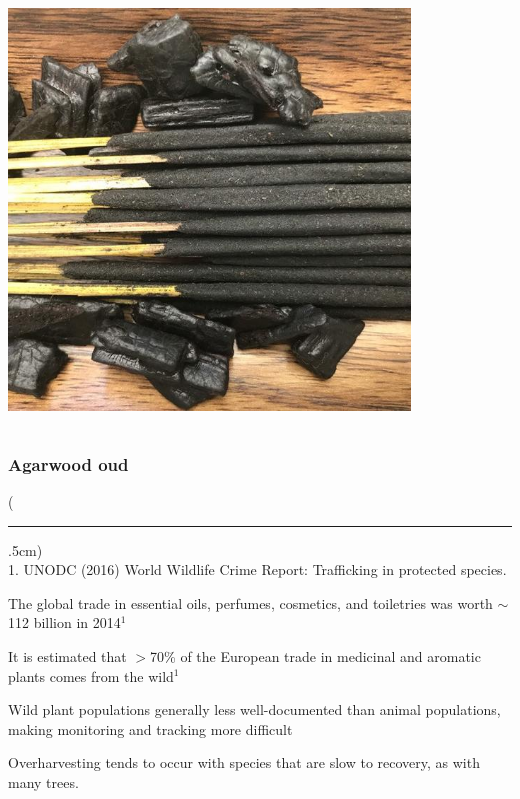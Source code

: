 \documentclass[10pt]{beamer}
\newenvironment{reference}[2]{%
	\begin{textblock*}{\textwidth}(#1,#2)
		\tiny\bgroup\color{gray}}{\egroup\end{textblock*}}
\begin{document}
\begin{frame}
\begin{center}
\begin{columns}
			\begin{column}{0.5\textwidth}
				\begin{center}
					\includegraphics[width=0.8\textwidth]{figures/agarwood2.jpg}
				\end{center}
			\end{column}
		\end{columns}
	\end{center}
\end{frame}


\begin{frame}[t]
\frametitle{Agarwood oud}
\vspace{0.5cm}

	\begin{reference}{4mm}{92mm}
		\rule{1.5cm}{0.25pt}\\
		1. UNODC (2016) World Wildlife Crime Report: Trafficking in protected species.
	\end{reference}
	
	The global trade in essential oils, perfumes, cosmetics, and toiletries was worth $\sim$112 billion in 2014$^{1}$\\
	
	\vspace{0.5cm}
	
	It is estimated that $>$70\% of the European trade in medicinal and aromatic plants comes from the wild$^{1}$\\
	
	\vspace{0.5cm}
	
	Wild plant populations generally less well-documented than animal populations, making monitoring and tracking more difficult\\
	
	\vspace{0.5cm}
	
	Overharvesting tends to occur with species that are slow to recovery, as with many trees.
\end{frame}
\end{document}
